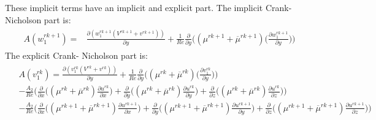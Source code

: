 \documentclass[preprint,12pt]{article}
\begin{document}
These implicit terms have an implicit and explicit part. The implicit Crank- Nicholson part is:
\begin{align}\begin{split}
A(w_1^{rk+1})=&\frac{\partial (w_1^{rk+1}(V^{rk+1}+v^{rk+1}))}{\partial y}+\frac{1}{Re}\frac{\partial}{\partial y}\Big(({\mu}^{rk+1}+\overline{\mu}^{rk+1})\Big(\frac{\partial w_1^{rk+1}}{\partial y}\Big)\Big)
\end{split} \end{align}	
The explicit Crank- Nicholson part is:
\begin{align}\begin{split}
&A(v_1^{rk})=\frac{\partial (v_1^{rk}(V^{rk}+v^{rk}))}{\partial y}+\frac{1}{Re}\frac{\partial}{\partial y}\Big(({\mu}^{rk}+\overline{\mu}^{rk})\Big(\frac{\partial v_1^{rk}}{\partial y}\Big)\Big)\\&-\frac{A_2}{Re}\Bigg(\frac{\partial}{\partial x}\Big((\mu^{rk}+\overline{\mu}^{rk})\frac{\partial u^{rk}}{\partial x}\Big)+\frac{\partial}{\partial y}\Big((\mu^{rk}+\overline{\mu}^{rk})\frac{\partial u^{rk}}{\partial y}\Big)+\frac{\partial}{\partial z}\Big((\mu^{rk}+\overline{\mu}^{rk})\frac{\partial u^{rk}}{\partial z}\Big)\Bigg)\\&-\frac{A_2}{Re}\Bigg(\frac{\partial}{\partial x}\Big((\mu^{rk+1}+\overline{\mu}^{rk+1})\frac{\partial u^{rk+1}}{\partial x}\Big)+\frac{\partial}{\partial y}\Big((\mu^{rk+1}+\overline{\mu}^{rk+1})\frac{\partial u^{rk+1}}{\partial y}\Big)+\frac{\partial}{\partial z}\Big((\mu^{rk+1}+\overline{\mu}^{rk+1})\frac{\partial u^{rk+1}}{\partial z}\Big)\Bigg)
\end{split} \end{align}	
\end{document}
